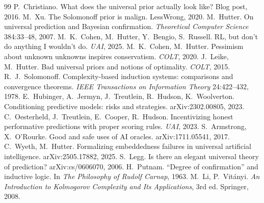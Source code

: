 \documentclass[11pt]{article}
\theoremstyle{definition}
\begin{document}
\begin{thebibliography}{99}\small
{} P.~Christiano. What does the universal prior actually look like? Blog post, 2016.
 M.~Xu. The Solomonoff prior is malign. LessWrong, 2020.
 M.~Hutter. On universal prediction and Bayesian confirmation. \emph{Theoretical Computer
Science} 384:33--48, 2007.
 M.~K.~Cohen, M.~Hutter, Y.~Bengio, S.~Russell. RL, but don't do anything I wouldn't do.
\emph{UAI}, 2025.
 M.~K.~Cohen, M.~Hutter. Pessimism about unknown unknowns inspires conservatism.
\emph{COLT}, 2020.
 J.~Leike, M.~Hutter. Bad universal priors and notions of optimality. \emph{COLT}, 2015.
 R.~J.~Solomonoff. Complexity-based induction systems: comparisons and convergence
theorems. \emph{IEEE Transactions on Information Theory} 24:422--432, 1978.
 E.~Hubinger, A.~Jermyn, J.~Treutlein, R.~Hudson, K.~Woolverton. Conditioning predictive
models: risks and strategies. arXiv:2302.00805, 2023.
 C.~Oesterheld, J.~Treutlein, E.~Cooper, R.~Hudson. Incentivizing honest performative
predictions with proper scoring rules. \emph{UAI}, 2023.
 S.~Armstrong, X.~O'Rourke. Good and safe uses of AI oracles. arXiv:1711.05541, 2017.
 C.~Wyeth, M.~Hutter. Formalizing embeddedness failures in universal artificial
intelligence. arXiv:2505.17882, 2025.
 S.~Legg. Is there an elegant universal theory of prediction? arXiv:cs/0606070, 2006.
 H.~Putnam. ``Degree of confirmation'' and inductive logic. In \emph{The Philosophy of
Rudolf Carnap}, 1963.
 M.~Li, P.~Vit\'anyi. \emph{An Introduction to Kolmogorov Complexity and Its Applications}, 3rd
ed. Springer, 2008.

\end{thebibliography}
\end{document}
